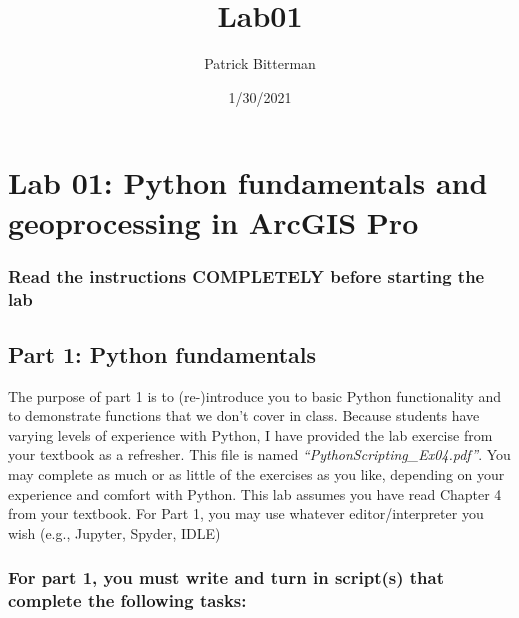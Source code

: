 \documentclass[]{article}
\title{Lab01}
\author{Patrick Bitterman}
\date{1/30/2021}
\makeatletter
\renewcommand{\maketitle}{\bgroup\vspace*{-1cm}\setlength{\parindent}{0pt}
\begin{flushleft}
  \@author
  
  \@date
  
\end{flushleft}\egroup
}
\makeatother
\begin{document}
\maketitle

\hypertarget{lab-01-python-fundamentals-and-geoprocessing-in-arcgis-pro}{%
\section{Lab 01: Python fundamentals and geoprocessing in ArcGIS
Pro}\label{lab-01-python-fundamentals-and-geoprocessing-in-arcgis-pro}}

\hypertarget{read-the-instructions-completely-before-starting-the-lab}{%
\subsubsection{Read the instructions COMPLETELY before starting the
lab}\label{read-the-instructions-completely-before-starting-the-lab}}

\hypertarget{part-1-python-fundamentals}{%
\subsection{Part 1: Python
fundamentals}\label{part-1-python-fundamentals}}

The purpose of part 1 is to (re-)introduce you to basic Python
functionality and to demonstrate functions that we don't cover in class.
Because students have varying levels of experience with Python, I have
provided the lab exercise from your textbook as a refresher. This file
is named \emph{``PythonScripting\_Ex04.pdf''}. You may complete as much
or as little of the exercises as you like, depending on your experience
and comfort with Python. This lab assumes you have read Chapter 4 from
your textbook. For Part 1, you may use whatever editor/interpreter you
wish (e.g., Jupyter, Spyder, IDLE)

\hypertarget{for-part-1-you-must-write-and-turn-in-scripts-that-complete-the-following-tasks}{%
\subsubsection{For part 1, you must write and turn in script(s) that
complete the following
tasks:}\label{for-part-1-you-must-write-and-turn-in-scripts-that-complete-the-following-tasks}}
\end{document}
